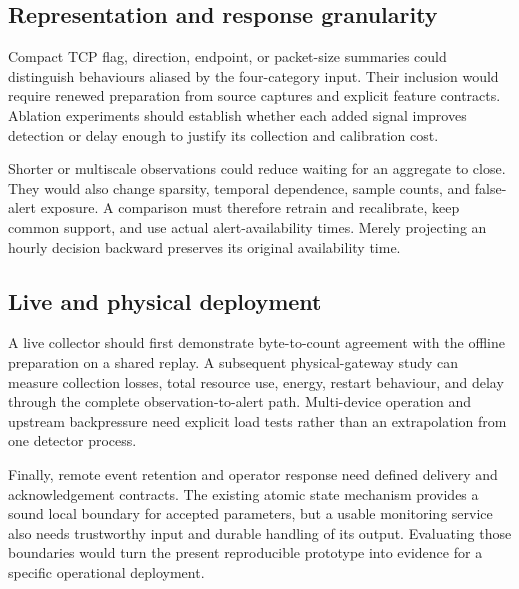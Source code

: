 \subsection{Representation and response granularity}

Compact TCP flag, direction, endpoint, or packet-size summaries
could distinguish behaviours aliased by the four-category input.
Their inclusion would require renewed preparation from source
captures and explicit feature contracts. Ablation experiments
should establish whether each added signal improves detection
or delay enough to justify its collection and calibration cost.

Shorter or multiscale observations could reduce waiting for an
aggregate to close. They would also change sparsity, temporal
dependence, sample counts, and false-alert exposure. A comparison
must therefore retrain and recalibrate, keep common support,
and use actual alert-availability times. Merely projecting an
hourly decision backward preserves its original availability time.

\subsection{Live and physical deployment}

A live collector should first demonstrate byte-to-count agreement
with the offline preparation on a shared replay. A subsequent
physical-gateway study can measure collection losses, total
resource use, energy, restart behaviour, and delay through the
complete observation-to-alert path. Multi-device operation and
upstream backpressure need explicit load tests rather than an
extrapolation from one detector process.

Finally, remote event retention and operator response need defined
delivery and acknowledgement contracts. The existing atomic state
mechanism provides a sound local boundary for accepted parameters,
but a usable monitoring service also needs trustworthy input and
durable handling of its output. Evaluating those boundaries would
turn the present reproducible prototype into evidence for a
specific operational deployment.
